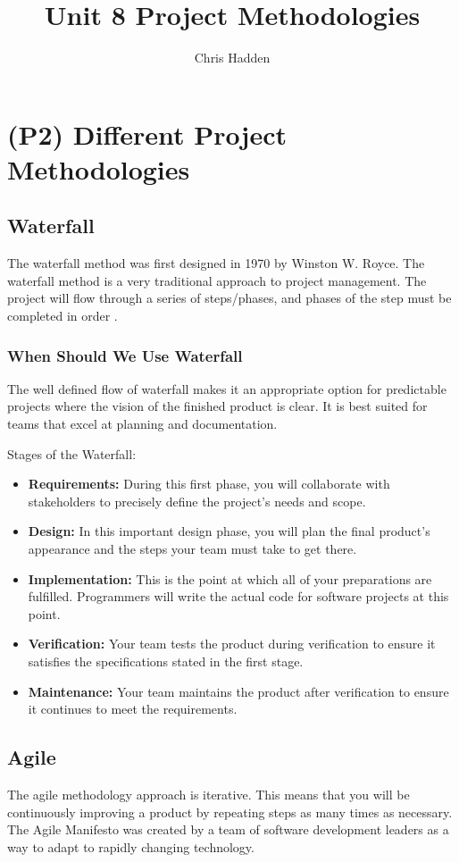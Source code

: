\documentclass{article}
\title{Unit 8 Project Methodologies}
\author{Chris Hadden}
\date{}
\begin{document}
\maketitle

\section{(P2) Different Project Methodologies}
\subsection{Waterfall}
The waterfall method was first designed in 1970 by Winston W. Royce. The waterfall method is a very traditional approach to project management. The project will flow through a series of steps/phases, and phases of the step must be completed in order \cite{waterfallref, royce}.

\subsubsection{When Should We Use Waterfall}
The well defined flow of waterfall makes it an appropriate option for predictable projects where the vision of the finished product is clear. It is best suited for teams that excel at planning and documentation.

Stages of the Waterfall:
\begin{itemize}
    \item \textbf{Requirements:} During this first phase, you will collaborate with stakeholders to precisely define the project's needs and scope.
    \item \textbf{Design:} In this important design phase, you will plan the final product's appearance and the steps your team must take to get there.
    \item \textbf{Implementation:} This is the point at which all of your preparations are fulfilled. Programmers will write the actual code for software projects at this point.
    \item \textbf{Verification:} Your team tests the product during verification to ensure it satisfies the specifications stated in the first stage.
    \item \textbf{Maintenance:} Your team maintains the product after verification to ensure it continues to meet the requirements.
\end{itemize}

\subsection{Agile}
The agile methodology approach is iterative. This means that you will be continuously improving a product by repeating steps as many times as necessary. The Agile Manifesto was created by a team of software development leaders as a way to adapt to rapidly changing technology.
\end{document}
